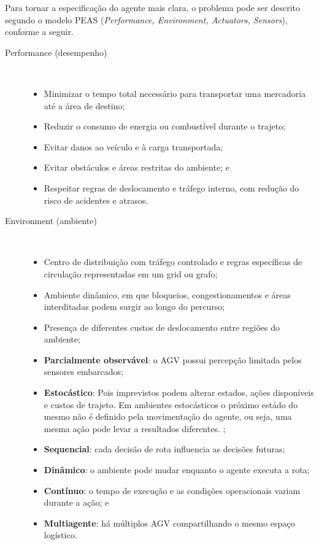 \documentclass[12pt,a4paper]{article}
\begin{document}
Para tornar a especificação do agente mais clara, o problema pode ser descrito segundo o modelo PEAS (\textit{Performance, Environment, Actuators, Sensors}), conforme a seguir.

\begin{description}
    \item[Performance (desempenho)] ~\\
    \begin{itemize}
        \item Minimizar o tempo total necessário para transportar uma mercadoria até a área de destino;
        \item Reduzir o consumo de energia ou combustível durante o trajeto;
        \item Evitar danos ao veículo e à carga transportada;
        \item Evitar obstáculos e áreas restritas do ambiente; e
        \item Respeitar regras de deslocamento e tráfego interno, com redução do risco de acidentes e atrasos.
    \end{itemize}

    \item[Environment (ambiente)] ~\\
    \begin{itemize}
        \item Centro de distribuição com tráfego controlado e regras específicas de circulação representadas em um grid ou grafo;
        \item Ambiente dinâmico, em que bloqueios, congestionamentos e áreas interditadas podem surgir ao longo do percurso;
        \item Presença de diferentes custos de deslocamento entre regiões do ambiente;
        \item \textbf{Parcialmente observável}: o \ac{AGV} possui percepção limitada pelos sensores embarcados;
        \item \textbf{Estocástico}: Pois imprevistos podem alterar estados, ações disponíveis e custos de trajeto. Em ambientes estocásticos o próximo estádo do mesmo não é definido pela movimentação do agente, ou seja, uma mesma ação pode levar a resultados diferentes.  \cite{russell2021};
        \item \textbf{Sequencial}: cada decisão de rota influencia as decisões futuras;
        \item \textbf{Dinâmico}: o ambiente pode mudar enquanto o agente executa a rota;
        \item \textbf{Contínuo}: o tempo de execução e as condições operacionais variam durante a ação; e
        \item \textbf{Multiagente}: há múltiplos \ac{AGV} compartilhando o mesmo espaço logístico.
    \end{itemize}


\end{description}
\end{document}
